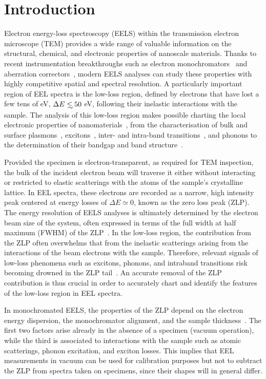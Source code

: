 \section{Introduction}
\label{sec:introduction}

Electron energy-loss spectroscopy (EELS) within the transmission electron microscope (TEM) provides
a wide range of
valuable information on the structural, chemical, and electronic properties of nanoscale materials.
%
Thanks to recent instrumentation breakthroughs
such as electron monochromators~\cite{Terauchi:2005, Freitag:2005} and aberration correctors~\cite{Haider:1998},
modern EELS analyses can study these properties with highly competitive spatial and spectral resolution.
%
A particularly important region of EEL spectra is
the low-loss region, defined by electrons that have lost a few tens of eV,
$\Delta E\lsim 50$ eV,
following their inelastic interactions with the sample.
%
The analysis of this low-loss region makes possible charting the local
electronic properties of nanomaterials~\cite{Geiger:1967}, from the characterisation of
bulk and surface plasmons~\cite{Schaffer:2008}, excitons~\cite{Erni:2005}, 
inter- and intra-band transitions~\cite{Rafferty:1998},
and phonons to the determination of their bandgap and band structure~\cite{Stoger:2008}.

Provided the specimen is electron-transparent, as required for TEM inspection,
the bulk of the incident electron beam will traverse it
either without interacting or restricted to elastic scatterings with the atoms
of the sample's crystalline lattice.
%
In EEL spectra, these electrons are recorded as a narrow,
high intensity peak centered at energy losses
of $\Delta E\simeq 0$, known as the zero loss peak (ZLP).
%
The energy resolution of EELS analyses is ultimately determined by
the electron beam size of the system, often expressed in terms
of the full width at half maximum (FWHM) of the
ZLP~\cite{Egerton:2009}.
%
In the low-loss region, the contribution from the ZLP
often overwhelms that from the inelastic scatterings arising from
the interactions of the beam electrons with the sample.
%
Therefore, relevant signals of low-loss phenomena such as excitons,
phonons, and intraband transitions risk becoming drowned
in the ZLP tail~\cite{Abajo:2010}.
%
An accurate removal of the ZLP
contribution is thus crucial in order to accurately chart and identify the features
of the low-loss region in EEL spectra.


In monochromated EELS, the properties of the ZLP depend on the electron energy dispersion,
the monochromator alignment, and the sample thickness~\cite{Park:2008, Stoger:2008}.
%
The first two factors arise already in the absence of a specimen (vacuum operation),
while the third is associated
to interactions with the sample such as atomic scatterings,
phonon excitation, and exciton losses.
%
This implies that EEL measurements in vacuum can be used for calibration purposes
but not to subtract the ZLP from spectra taken on specimens, since their shapes will
in general differ.




